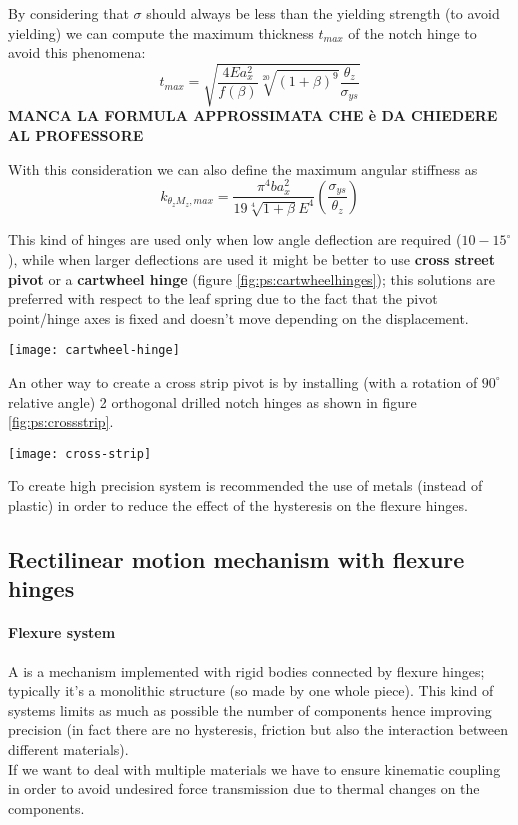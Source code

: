 		By considering that $\sigma$ should always be less than the yielding strength (to avoid yielding) we can compute the maximum thickness $t_{max}$ of the notch hinge to avoid this phenomena:
		\[ t_{max} = \sqrt{ \frac{4Ea_x^2}{f(\beta)} \sqrt[20]{(1+\beta)^9} \frac{\theta_z}{\sigma_{ys}} } \]
		\textbf{MANCA LA FORMULA APPROSSIMATA CHE è DA CHIEDERE AL PROFESSORE}
		
		With this consideration we can also define the maximum angular stiffness as
		\[ k_{\theta_z M_z,max} = \frac{\pi^4 b a_x^2}{19 \sqrt[4]{1+\beta}E^4 } \left( \frac{\sigma_{ys}}{\theta_z} \right) \]
		
		
		\vspace{3mm}
		
		This kind of hinges are used only when low angle deflection are required ($10-15^\circ$), while when larger deflections are used it might be better to use \textbf{cross street pivot}  or a \textbf{cartwheel hinge} (figure \ref{fig:ps:cartwheelhinges}); this solutions are preferred with respect to the leaf spring due to the fact that the pivot point/hinge axes is fixed and doesn't move depending on the displacement.
		
		\begin{SCfigure}[1][bht]
			\centering
			\texttt{[image: cartwheel-hinge]}
			\caption{cross street pivot (on the left) and cartwheel (right) hinges.}
			\label{fig:ps:cartwheelhinges}
		\end{SCfigure}
		
		An other way to create a cross strip pivot is by installing (with a rotation of $90^\circ$ relative angle) 2 orthogonal drilled notch hinges as shown in figure \ref{fig:ps:crossstrip}.
		
		\begin{SCfigure}[1][bht]
			\centering
			\texttt{[image: cross-strip]}
			\caption{example of a cross strip pivots realised with 2 orthogonal drilled notch hinges.} \label{fig:ps:crossstrip}
		\end{SCfigure}
		
		
		To create high precision system is recommended the use of metals (instead of plastic) in order to reduce the effect of the hysteresis on the flexure hinges.
	
	
	\subsection{Rectilinear motion mechanism with flexure hinges}
		\paragraph{Flexure system} A  is a mechanism implemented with rigid bodies connected by flexure hinges; typically it's a monolithic structure (so made by one whole piece). This kind of systems limits as much as possible the number of components hence improving precision (in fact there are no hysteresis, friction but also the interaction between different materials). \\
		If we want to deal with multiple materials we have to ensure kinematic coupling in order to avoid undesired force transmission due to thermal changes on the components.
		
